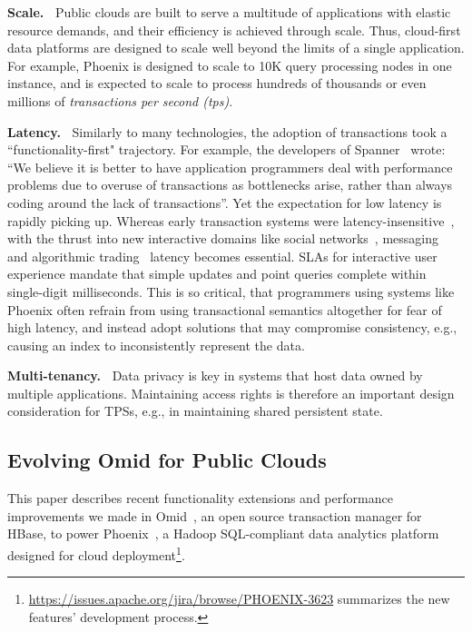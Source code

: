 {\bf Scale.\ } 
Public clouds  are built to  serve a multitude of applications 
with elastic resource demands, and their efficiency is achieved through  scale. 
Thus, cloud-first data platforms are  designed to scale well beyond the limits of a single application. 
For example, Phoenix is designed to scale to 10K query processing 
nodes in one instance, and is expected to scale to process hundreds
 of thousands or even millions of \emph{transactions per second (tps)}. 
 

{\bf Latency.\ }
Similarly to many technologies, the adoption of transactions took a  ``functionality-first" trajectory. 
For example, the developers of Spanner~\cite{Spanner2012} wrote: 
  ``We believe it
is better to have application programmers deal with performance problems due to overuse 
of transactions as bottlenecks arise, rather than always coding around the lack of transactions''. 
Yet the expectation for low latency is rapidly picking up. 
Whereas early transaction systems were  latency-insensitive~\cite{Percolator2010, Omid2017}, 
with the thrust into new interactive domains like social networks~\cite{chatter},  
messaging~\cite{Borthakur:2011} and algorithmic trading~\cite{opentsdb} latency becomes essential.  
SLAs for interactive user experience mandate that simple updates and point queries  complete within 
single-digit milliseconds. 
This is so critical, that programmers using systems like Phoenix often
refrain from using transactional semantics altogether for fear of high latency, 
and instead  adopt solutions that may compromise consistency, e.g., 
causing an index to inconsistently represent the data.

{\bf Multi-tenancy.\ } Data privacy is key in systems that host data owned by multiple applications.
Maintaining  access rights is therefore an important design consideration for TPSs, 
e.g., in maintaining shared persistent state. 

\subsection{Evolving Omid for Public Clouds}

This paper describes recent functionality extensions and performance improvements 
we made in Omid~\cite{omid}, an open source transaction manager for HBase, to power 
Phoenix~\cite{phoenix},  a Hadoop SQL-compliant  data analytics platform designed 
for cloud deployment\footnote{\small{\url{https://issues.apache.org/jira/browse/PHOENIX-3623}
summarizes the new features' development process.}}. 

